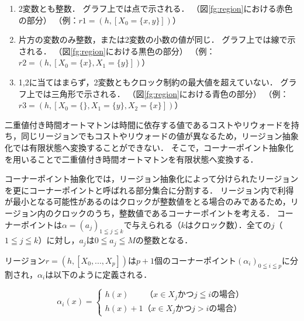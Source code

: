 \documentclass{ieicej}
\begin{document}
\begin{enumerate}
	\item 2変数とも整数．
	グラフ上では点で示される．
	（図\ref{fg:region}における赤色の部分）
	（例：$r1 = (h, [X_0 =\{x, y\}]) $）
	\item 片方の変数のみ整数，または2変数の小数の値が同じ．
	グラフ上では線で示される．
	（図\ref{fg:region}における黒色の部分）
	（例：$r2 = (h, [X_0 =\{x\}, X_1=\{y\}]) $）
	\item 1,2に当てはまらず，2変数ともクロック制約の最大値を超えていない．
	グラフ上では三角形で示される．
	（図\ref{fg:region}における青色の部分）
	（例：$r3 = (h, [X_0 =\{\}, X_1=\{y\}, X_2=\{x\}]) $）
\end{enumerate}



二重値付き時間オートマトンは時間に依存する値であるコストやリウォードを持ち，同じリージョンでもコストやリウォードの値が異なるため，リージョン抽象化では有限状態へ変換することができない．
そこで，コーナーポイント抽象化を用いることで二重値付き時間オートマトンを有限状態へ変換する．

コーナーポイント抽象化では，リージョン抽象化によって分けられたリージョンを更にコーナーポイントと呼ばれる部分集合に分割する．
リージョン内で利得が最小となる可能性があるのはクロックが整数値をとる場合のみであるため，リージョン内のクロックのうち，整数値であるコーナーポイントを考える．
	コーナーポイントは$\alpha = (a_j)_{1\leqq j \leqq k}$で与えられる（$k$はクロック数）．全ての$j$（$1 \leqq j \leqq k$）に対し，$a_j$は$0 \leqq a_j \leqq M$の整数となる．

リージョン$r=(h, [X_0, ..., X_p])$は$p+1$個のコーナーポイント$(\alpha_i)_{0 \leqq i \leqq p}$に分割され，$\alpha_i$は以下のように定義される．

\begin{equation}
	\alpha_i(x) = \left \{
	\begin{array}{l}
		h(x)\:\:\:\:\:\:\:\:\:（x \in X_j かつ j \leqq iの場合） \\
		h(x)+1（x \in X_j かつ j > iの場合）
	\end{array}
	\right.
\end{equation}
\end{document}
